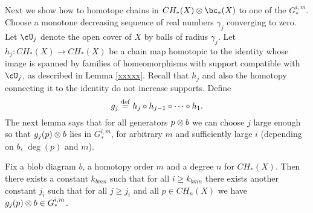 Next we show how to homotope chains in $CH_*(X)\ot \bc_*(X)$ to one of the 
$G_*^{i,m}$.
Choose a monotone decreasing sequence of real numbers $\gamma_j$ converging to zero.
Let $\cU_j$ denote the open cover of $X$ by balls of radius $\gamma_j$.
Let $h_j: CH_*(X)\to CH_*(X)$ be a chain map homotopic to the identity whose image is spanned by families of homeomorphisms with support compatible with $\cU_j$, as described in Lemma \ref{xxxxx}.
Recall that $h_j$ and also the homotopy connecting it to the identity do not increase
supports.
Define
\[
	g_j \stackrel{\mathrm{def}}{=} h_j\circ h_{j-1} \circ \cdots \circ h_1 .
\]
The next lemma says that for all generators $p\otimes b$ we can choose $j$ large enough so that
$g_j(p)\otimes b$ lies in $G_*^{i,m}$, for arbitrary $m$ and sufficiently large $i$ 
(depending on $b$, $\deg(p)$ and $m$).

\begin{lemma} \label{Gim_approx}
Fix a blob diagram $b$, a homotopy order $m$ and a degree $n$ for $CH_*(X)$.
Then there exists a constant $k_{bmn}$ such that for all $i \ge k_{bmn}$
there exists another constant $j_i$ such that for all $j \ge j_i$ and all $p\in CH_n(X)$ 
we have $g_j(p)\otimes b \in G_*^{i,m}$.
\end{lemma}

